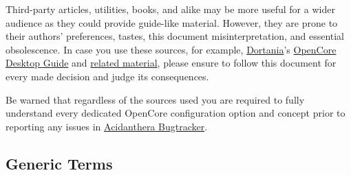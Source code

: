 \documentclass[]{article}
\begin{document}
Third-party articles, utilities, books, and alike may be more useful for a wider audience as
they could provide guide-like material. However, they are prone to their authors' preferences,
tastes, this document misinterpretation, and essential obsolescence.
In case you use these sources, for example, \href{https://dortania.github.io}{Dortania}'s
\href{https://dortania.github.io/OpenCore-Desktop-Guide}{OpenCore Desktop Guide}
and \href{https://dortania.github.io/getting-started}{related material},
please ensure to follow this document for every made decision and judge its consequences.

Be warned that regardless of the sources used you are required to fully understand every
dedicated OpenCore configuration option and concept prior to reporting any issues in
\href{https://github.com/acidanthera/bugtracker}{Acidanthera Bugtracker}.

\subsection{Generic Terms}\label{generic-terms}
\end{document}
